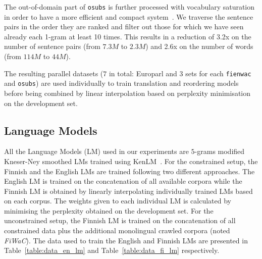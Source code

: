 \documentclass[postprint]{flammie}
\begin{document}
The out-of-domain part of \texttt{osubs} is further processed with vocabulary saturation~\cite{lewis2013dramatically} in order to have a more efficient and compact system~\cite{rubino-EtAl:2014:W14-33}.
We traverse the sentence pairs in the order they are ranked and filter out those for which we have seen already each 1-gram at least 10 times.
This results in a reduction of 3.2x on the number of sentence pairs (from $7.3M$ to $2.3M$) and 2.6x on the number of words (from $114M$ to $44M$).

The resulting parallel datasets ($7$ in total: Europarl and 3 sets for each \texttt{fienwac} and \texttt{osubs}) are used individually to train translation and reordering models before being combined by linear interpolation based on perplexity minimisation on the development set.~\cite{sennrich2012perplexity}
%
\subsection{Language Models}
\label{subsection:language_model}
%
All the Language Models (LM) used in our experiments are $5$-grams modified Kneser-Ney smoothed LMs trained using KenLM~\cite{heafield2013estimate}. For the constrained setup, the Finnish and the English LMs are trained following two different approaches. The English LM is trained on the concatenation of all available corpora while the Finnish LM is obtained by linearly interpolating individually trained LMs based on each corpus. The weights given to each individual LM is calculated by minimising the perplexity obtained on the development set. For the unconstrained setup, the Finnish LM is trained on the concatenation of all constrained data plus the additional monolingual crawled corpora (noted \textit{FiWaC}). The data used to train the English and Finnish LMs are presented in Table~\ref{table:data_en_lm} and Table~\ref{table:data_fi_lm} respectively.
%
\end{document}
